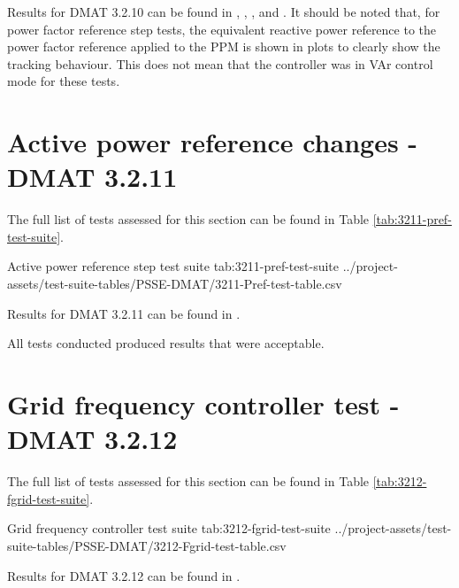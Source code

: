 \documentclass{../grid-link-report}
\newcommand{\projectassetsdir}{../project-assets}
\begin{document}
	Results for DMAT 3.2.10 can be found in , , , and . It should be noted that, for power factor reference step tests, the equivalent reactive power reference to the power factor reference applied to the \ac{PPM} is shown in plots to clearly show the tracking behaviour. This does not mean that the controller was in VAr control mode for these tests.
	
	
	
	\section{Active power reference changes - DMAT 3.2.11}	
	\label{sec:pref-step-tests}
	
	
	
	
	
	The full list of tests assessed for this section can be found in Table \ref{tab:3211-pref-test-suite}.
	
	{
		\fontsize{6}{8}\selectfont
		\autoscaledlongtable
		{Active power reference step test suite}
		{tab:3211-pref-test-suite}
		{\projectassetsdir/test-suite-tables/PSSE-DMAT/3211-Pref-test-table.csv}
	}
	
	Results for DMAT 3.2.11 can be found in .
	
	All tests conducted produced results that were acceptable.
	
	
	\section{Grid frequency controller test - DMAT 3.2.12}		
	
	
	
	
	The full list of tests assessed for this section can be found in Table \ref{tab:3212-fgrid-test-suite}.
	
	{
		\fontsize{7}{9}\selectfont
		\autoscaledlongtable
		{Grid frequency controller test suite}
		{tab:3212-fgrid-test-suite}
		{\projectassetsdir/test-suite-tables/PSSE-DMAT/3212-Fgrid-test-table.csv}
	}
	
	Results for DMAT 3.2.12 can be found in .	
	
\end{document}
